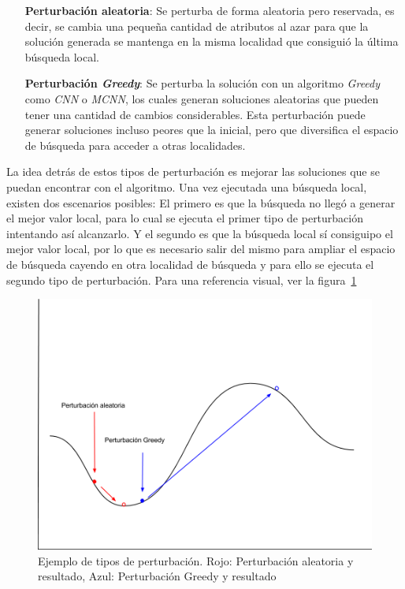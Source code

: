 \documentclass{ci5652}
\begin{document}
\begin{itemize}
\item [\textbf{Perturbación aleatoria}:] Se perturba de forma aleatoria pero reservada, es decir, se cambia una pequeña cantidad de atributos al azar para que la solución generada se mantenga en la misma localidad que consiguió la última búsqueda local.
\item [\textbf{Perturbación \textit{Greedy}}:] Se perturba la solución con un algoritmo \textit{Greedy} como \textit{CNN }o \textit{MCNN}, los cuales generan soluciones aleatorias que pueden tener una cantidad de cambios considerables. Esta perturbación puede generar soluciones incluso peores que la inicial, pero que diversifica el espacio de búsqueda para acceder a otras localidades. 
\end{itemize}

La idea detrás de estos tipos de perturbación es mejorar las soluciones que se puedan encontrar con el algoritmo. Una vez ejecutada una búsqueda local, existen dos escenarios posibles: El primero es que la búsqueda no llegó a generar el mejor valor local, para lo cual se ejecuta el primer tipo de perturbación intentando así alcanzarlo. Y el segundo es que la búsqueda local sí consiguipo el mejor valor local, por lo que es necesario salir del mismo para ampliar el espacio de búsqueda cayendo en otra localidad de búsqueda y para ello se ejecuta el segundo tipo de perturbación. Para una referencia visual, ver la figura~\ref{fig:perturbaciones}

\begin{figure}[h!]
	\centering
	\includegraphics[width=\linewidth]{perturbaciones}
	\caption{Ejemplo de tipos de perturbación. Rojo: Perturbación aleatoria y resultado, Azul: Perturbación Greedy y resultado}
	\label{fig:perturbaciones}
\end{figure}
\end{document}
